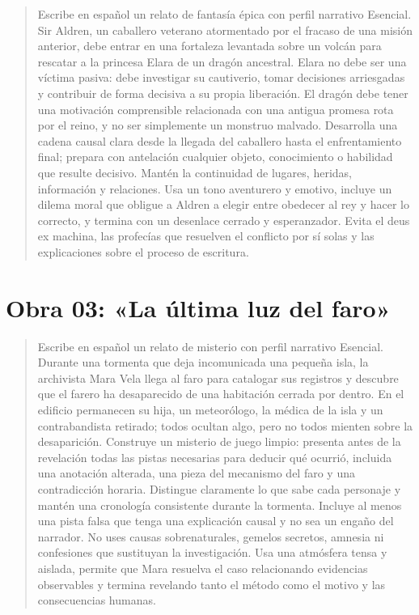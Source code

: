 \begin{quote}\small
Escribe en español un relato de fantasía épica con perfil narrativo Esencial. Sir Aldren, un caballero
veterano atormentado por el fracaso de una misión anterior, debe entrar en una fortaleza levantada
sobre un volcán para rescatar a la princesa Elara de un dragón ancestral. Elara no debe ser una víctima
pasiva: debe investigar su cautiverio, tomar decisiones arriesgadas y contribuir de forma decisiva a su
propia liberación. El dragón debe tener una motivación comprensible relacionada con una antigua promesa
rota por el reino, y no ser simplemente un monstruo malvado. Desarrolla una cadena causal clara desde la
llegada del caballero hasta el enfrentamiento final; prepara con antelación cualquier objeto,
conocimiento o habilidad que resulte decisivo. Mantén la continuidad de lugares, heridas, información y
relaciones. Usa un tono aventurero y emotivo, incluye un dilema moral que obligue a Aldren a elegir
entre obedecer al rey y hacer lo correcto, y termina con un desenlace cerrado y esperanzador. Evita el
deus ex machina, las profecías que resuelven el conflicto por sí solas y las explicaciones sobre el
proceso de escritura.
\end{quote}

\section*{Obra 03: «La última luz del faro»}

\begin{quote}\small
Escribe en español un relato de misterio con perfil narrativo Esencial. Durante una tormenta que deja
incomunicada una pequeña isla, la archivista Mara Vela llega al faro para catalogar sus registros y
descubre que el farero ha desaparecido de una habitación cerrada por dentro. En el edificio permanecen
su hija, un meteorólogo, la médica de la isla y un contrabandista retirado; todos ocultan algo, pero no
todos mienten sobre la desaparición. Construye un misterio de juego limpio: presenta antes de la
revelación todas las pistas necesarias para deducir qué ocurrió, incluida una anotación alterada, una
pieza del mecanismo del faro y una contradicción horaria. Distingue claramente lo que sabe cada
personaje y mantén una cronología consistente durante la tormenta. Incluye al menos una pista falsa que
tenga una explicación causal y no sea un engaño del narrador. No uses causas sobrenaturales, gemelos
secretos, amnesia ni confesiones que sustituyan la investigación. Usa una atmósfera tensa y aislada,
permite que Mara resuelva el caso relacionando evidencias observables y termina revelando tanto el
método como el motivo y las consecuencias humanas.
\end{quote}

